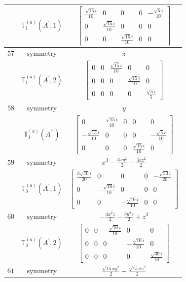 \documentclass[fleqn,8pt,landscape]{jsarticle}
\begin{document}
\begin{longtable}{ccc}
$  $ & $ \mathbb{T}_{1}^{(a)}(A^{\prime},1) $ & $ \begin{bmatrix} \frac{\sqrt{15} i}{10} & 0 & 0 & 0 & - \frac{\sqrt{5} i}{10} \\ 0 & \frac{\sqrt{15} i}{10} & 0 & 0 & 0 \\ 0 & 0 & \frac{\sqrt{15} i}{10} & 0 & 0 \end{bmatrix} $ \\ \hline
$ 57 $ & $ \text{symmetry} $ & $ z $ \\
$  $ & $ \mathbb{T}_{1}^{(a)}(A^{\prime},2) $ & $ \begin{bmatrix} 0 & 0 & \frac{\sqrt{15} i}{10} & 0 & 0 \\ 0 & 0 & 0 & \frac{\sqrt{15} i}{10} & 0 \\ 0 & 0 & 0 & 0 & \frac{\sqrt{5} i}{5} \end{bmatrix} $ \\ \hline
$ 58 $ & $ \text{symmetry} $ & $ y $ \\
$  $ & $ \mathbb{T}_{1}^{(a)}(A^{\prime\prime}) $ & $ \begin{bmatrix} 0 & \frac{\sqrt{15} i}{10} & 0 & 0 & 0 \\ - \frac{\sqrt{15} i}{10} & 0 & 0 & 0 & - \frac{\sqrt{5} i}{10} \\ 0 & 0 & 0 & \frac{\sqrt{15} i}{10} & 0 \end{bmatrix} $ \\ \hline
$ 59 $ & $ \text{symmetry} $ & $ x^{3} - \frac{3 x y^{2}}{2} - \frac{3 x z^{2}}{2} $ \\
$  $ & $ \mathbb{T}_{3}^{(a)}(A^{\prime},1) $ & $ \begin{bmatrix} \frac{3 \sqrt{10} i}{20} & 0 & 0 & 0 & - \frac{\sqrt{30} i}{20} \\ 0 & - \frac{\sqrt{10} i}{10} & 0 & 0 & 0 \\ 0 & 0 & - \frac{\sqrt{10} i}{10} & 0 & 0 \end{bmatrix} $ \\ \hline
$ 60 $ & $ \text{symmetry} $ & $ - \frac{3 x^{2} z}{2} - \frac{3 y^{2} z}{2} + z^{3} $ \\
$  $ & $ \mathbb{T}_{3}^{(a)}(A^{\prime},2) $ & $ \begin{bmatrix} 0 & 0 & - \frac{\sqrt{10} i}{10} & 0 & 0 \\ 0 & 0 & 0 & - \frac{\sqrt{10} i}{10} & 0 \\ 0 & 0 & 0 & 0 & \frac{\sqrt{30} i}{10} \end{bmatrix} $ \\ \hline
$ 61 $ & $ \text{symmetry} $ & $ \frac{\sqrt{15} x y^{2}}{2} - \frac{\sqrt{15} x z^{2}}{2} $ \\

\end{longtable}
\end{document}
